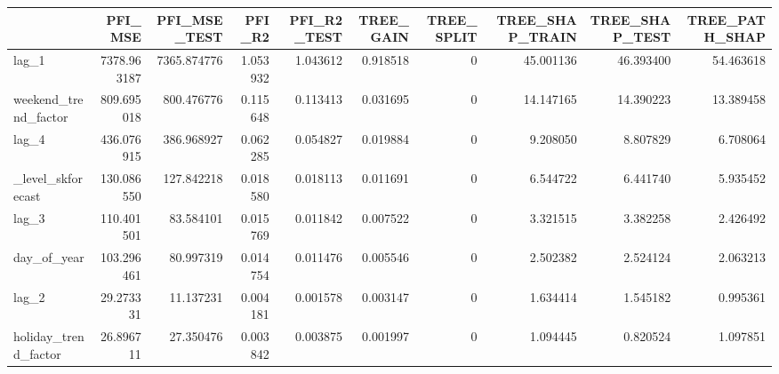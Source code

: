 \begin{tabular}{lrrrrrrrrr}
\toprule
 & PFI_MSE & PFI_MSE_TEST & PFI_R2 & PFI_R2_TEST & TREE_GAIN & TREE_SPLIT & TREE_SHAP_TRAIN & TREE_SHAP_TEST & TREE_PATH_SHAP \\
\midrule
lag_1 & 7378.963187 & 7365.874776 & 1.053932 & 1.043612 & 0.918518 & 0 & 45.001136 & 46.393400 & 54.463618 \\
weekend_trend_factor & 809.695018 & 800.476776 & 0.115648 & 0.113413 & 0.031695 & 0 & 14.147165 & 14.390223 & 13.389458 \\
lag_4 & 436.076915 & 386.968927 & 0.062285 & 0.054827 & 0.019884 & 0 & 9.208050 & 8.807829 & 6.708064 \\
_level_skforecast & 130.086550 & 127.842218 & 0.018580 & 0.018113 & 0.011691 & 0 & 6.544722 & 6.441740 & 5.935452 \\
lag_3 & 110.401501 & 83.584101 & 0.015769 & 0.011842 & 0.007522 & 0 & 3.321515 & 3.382258 & 2.426492 \\
day_of_year & 103.296461 & 80.997319 & 0.014754 & 0.011476 & 0.005546 & 0 & 2.502382 & 2.524124 & 2.063213 \\
lag_2 & 29.273331 & 11.137231 & 0.004181 & 0.001578 & 0.003147 & 0 & 1.634414 & 1.545182 & 0.995361 \\
holiday_trend_factor & 26.896711 & 27.350476 & 0.003842 & 0.003875 & 0.001997 & 0 & 1.094445 & 0.820524 & 1.097851 \\
\bottomrule
\end{tabular}
